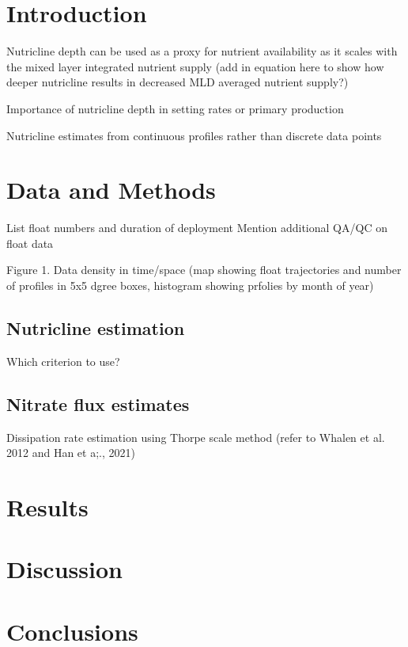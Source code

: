 \documentclass[utf8]{frontiersSCNS} %
\begin{document}
\section{Introduction}
Nutricline depth can be used as a proxy for nutrient availability as it scales with the mixed layer integrated nutrient supply (add in equation here to show how deeper nutricline results in decreased MLD averaged nutrient supply?)

Importance of nutricline depth in setting rates or primary production \citep{richardson2019vertical}

Nutricline estimates from continuous profiles rather than discrete data points

\section{Data and Methods}
List float numbers and duration of deployment
Mention additional QA/QC on float data \citep{maurer2021delayed}

Figure 1. Data density in time/space (map showing float trajectories and number of profiles in 5x5 dgree boxes, histogram showing prfolies by month of year)

\subsection{Nutricline estimation}
Which criterion to use? 

\subsection{Nitrate flux estimates}
Dissipation rate estimation using Thorpe scale method (refer to Whalen et al. 2012 and Han et a;., 2021)


\section{Results}



\section{Discussion}


\section{Conclusions}
\end{document}
